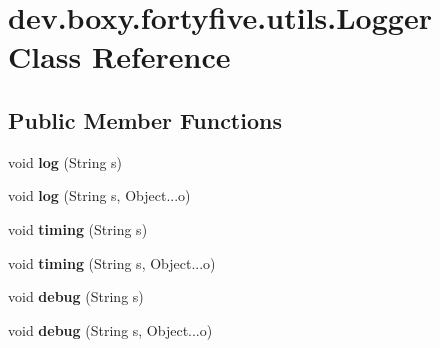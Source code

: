 \hypertarget{classdev_1_1boxy_1_1fortyfive_1_1utils_1_1_logger}{
\section{dev.boxy.fortyfive.utils.Logger Class Reference}
\label{d8/d25/classdev_1_1boxy_1_1fortyfive_1_1utils_1_1_logger}
}
\subsection*{Public Member Functions}
\begin{DoxyCompactItemize}
\item 
\hypertarget{classdev_1_1boxy_1_1fortyfive_1_1utils_1_1_logger_a940e54a1403b0786e7a045c64969cbc0}{
void {\bfseries log} (String s)}
\label{d8/d25/classdev_1_1boxy_1_1fortyfive_1_1utils_1_1_logger_a940e54a1403b0786e7a045c64969cbc0}

\item 
\hypertarget{classdev_1_1boxy_1_1fortyfive_1_1utils_1_1_logger_a545be8c89b2d70c803e4c3eb58c95009}{
void {\bfseries log} (String s, Object...o)}
\label{d8/d25/classdev_1_1boxy_1_1fortyfive_1_1utils_1_1_logger_a545be8c89b2d70c803e4c3eb58c95009}

\item 
\hypertarget{classdev_1_1boxy_1_1fortyfive_1_1utils_1_1_logger_ae2e4db9b319c5b7a55b4a8a6cdeacdd6}{
void {\bfseries timing} (String s)}
\label{d8/d25/classdev_1_1boxy_1_1fortyfive_1_1utils_1_1_logger_ae2e4db9b319c5b7a55b4a8a6cdeacdd6}

\item 
\hypertarget{classdev_1_1boxy_1_1fortyfive_1_1utils_1_1_logger_a5a446189482907c9dc180226d23b939a}{
void {\bfseries timing} (String s, Object...o)}
\label{d8/d25/classdev_1_1boxy_1_1fortyfive_1_1utils_1_1_logger_a5a446189482907c9dc180226d23b939a}

\item 
\hypertarget{classdev_1_1boxy_1_1fortyfive_1_1utils_1_1_logger_ac3678081455a250208401b2c090d6edb}{
void {\bfseries debug} (String s)}
\label{d8/d25/classdev_1_1boxy_1_1fortyfive_1_1utils_1_1_logger_ac3678081455a250208401b2c090d6edb}

\item 
\hypertarget{classdev_1_1boxy_1_1fortyfive_1_1utils_1_1_logger_ab9f72636a81ba45e9a714ac6cc2b92de}{
void {\bfseries debug} (String s, Object...o)}
\label{d8/d25/classdev_1_1boxy_1_1fortyfive_1_1utils_1_1_logger_ab9f72636a81ba45e9a714ac6cc2b92de}


\end{DoxyCompactItemize}
